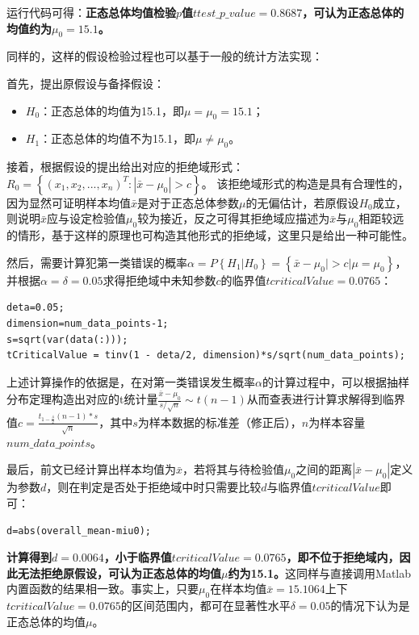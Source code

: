 \documentclass[12pt]{article}  %
\begin{document}
运行代码可得：\textbf{正态总体均值检验$p$值$ttest\_p\_value=0.8687$，可认为正态总体的均值约为$\mu_0=15.1$。}

同样的，这样的假设检验过程也可以基于一般的统计方法实现：

首先，提出原假设与备择假设：
\begin{itemize}
	\setlength{\parsep}{0ex} %
	\setlength{\topsep}{2ex} %
	\setlength{\itemsep}{1ex} %
	\item \textbf{$H_0$}：正态总体的均值为15.1，即$\mu=\mu_0=15.1$；		
	\item \textbf{$H_1$}：正态总体的均值不为15.1，即$\mu \neq \mu_0$。
\end{itemize}

接着，根据假设的提出给出对应的拒绝域形式：$R_0 = \left\{ (x_1, x_2,...,x_n)^T :|\bar{x}-\mu_0| >c \right\} $。
该拒绝域形式的构造是具有合理性的，因为显然可证明样本均值$\bar{x}$是对于正态总体参数$\mu$的无偏估计，若原假设$H_0$成立，则说明$\bar{x}$应与设定检验值$\mu_0$较为接近，反之可得其拒绝域应描述为$\bar{x}$与$\mu_0$相距较远的情形，基于这样的原理也可构造其他形式的拒绝域，这里只是给出一种可能性。


然后，需要计算犯第一类错误的概率$\alpha=P \left\{H_1|H_0\right\} = \left\{\bar{x}-\mu_0| >c|\mu=\mu_0\right\}$，并根据$\alpha = \delta = 0.05$求得拒绝域中未知参数$c$的临界值$tcriticalValue = 0.0765$：

\begin{lstlisting}
deta=0.05;
dimension=num_data_points-1;
s=sqrt(var(data(:)));
tCriticalValue = tinv(1 - deta/2, dimension)*s/sqrt(num_data_points);
\end{lstlisting}

上述计算操作的依据是，在对第一类错误发生概率$\alpha$的计算过程中，可以根据抽样分布定理构造出对应的t统计量$\frac{\bar{x}-\mu_0}{s/\sqrt{n}} \sim t(n-1)$从而查表进行计算求解得到临界值$c=\frac{t_{1-\frac{\delta}{2}}(n-1)*s}{\sqrt{n}}$，其中$s$为样本数据的标准差（修正后），$n$为样本容量$num\_data\_points$。

最后，前文已经计算出样本均值为$\bar{x}$，若将其与待检验值$\mu_0$之间的距离$|\bar{x}-\mu_0|$定义为参数$d$，则在判定是否处于拒绝域中时只需要比较$d$与临界值$tcriticalValue$即可：
\begin{lstlisting}
d=abs(overall_mean-miu0);
\end{lstlisting}

\textbf{计算得到$d=0.0064$，小于临界值$tcriticalValue = 0.0765$，即不位于拒绝域内，因此无法拒绝原假设，可认为正态总体的均值$\mu$约为15.1。}这同样与直接调用Matlab内置函数的结果相一致。事实上，只要$\mu_0$在样本均值$\bar{x}=15.1064$上下$tcriticalValue = 0.0765$的区间范围内，都可在显著性水平$\delta=0.05$的情况下认为是正态总体的均值$\mu$。
\end{document}

